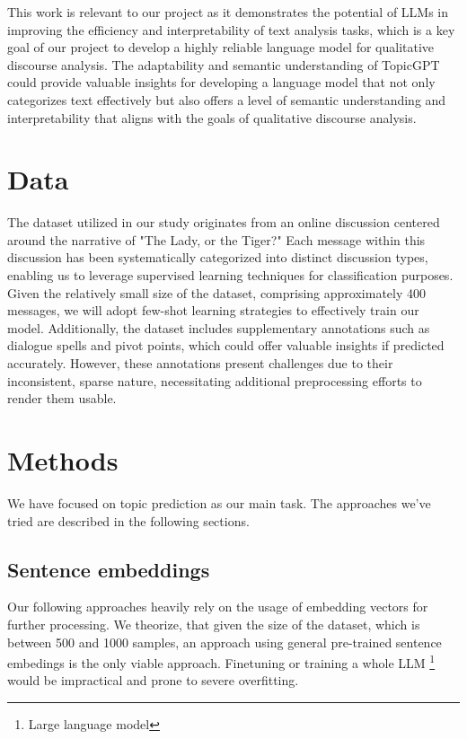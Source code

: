 \documentclass[fleqn,moreauthors,10pt]{ds_report}
\begin{document}
This work is relevant to our project as it demonstrates the potential of LLMs in improving the efficiency and interpretability of text analysis tasks, which is a key goal of our project to develop a highly reliable language model for qualitative discourse analysis. The adaptability and semantic understanding of TopicGPT could provide valuable insights for developing a language model that not only categorizes text effectively but also offers a level of semantic understanding and interpretability that aligns with the goals of qualitative discourse analysis.


\section*{Data}

The dataset utilized in our study originates from an online discussion centered around the narrative of "The Lady, or the Tiger?" Each message within this discussion has been systematically categorized into distinct discussion types, enabling us to leverage supervised learning techniques for classification purposes. Given the relatively small size of the dataset, comprising approximately 400 messages, we will adopt few-shot learning strategies to effectively train our model. Additionally, the dataset includes supplementary annotations such as dialogue spells and pivot points, which could offer valuable insights if predicted accurately. However, these annotations present challenges due to their inconsistent, sparse nature, necessitating additional preprocessing efforts to render them usable.

\section*{Methods}

We have focused on topic prediction as our main task. The approaches we've tried are described in the following sections.
 
\subsection{Sentence embeddings}\label{sentence-embedings}
Our following approaches heavily rely on the usage of embedding vectors for further processing. We theorize, that given the size of the dataset, which is between 500 and 1000 samples, an approach using general pre-trained sentence embedings is the only viable approach. Finetuning or training a whole LLM \footnote{Large language model} would be impractical and prone to severe overfitting.
\end{document}
